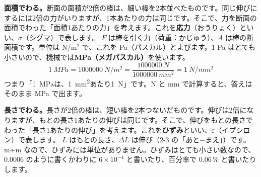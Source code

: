 \noindent\textbf{面積でわる。}\quad 断面の面積が2倍の棒は、細い棒を2本並べたものです。同じ伸びにするには2倍の力がいりますが、1本あたりの力は同じです。そこで、力を断面の面積でわった「面積1あたりの力」を考えます。これを\textbf{応力}（おうりょく）といい、$\sigma$（シグマ）で表します。
\label{ph:力-8:sigmaE}$F$ は棒を引く力（荷重：かじゅう）、$A$ は棒の断面積です。単位は N/m$^2$ で、これを Pa（パスカル）とよびます。1 Pa はとても小さいので、機械では\textbf{MPa（メガパスカル）}を使います。
\[\qty{1}{MPa}=\qty{1000000}{N/m^2}=\frac{\qty{1000000}{N}}{\qty{1000000}{mm^2}}=\qty{1}{N/mm^2}\]
つまり「\qty{1}{MPa}は、\qty{1}{mm^2}あたり\qty{1}{N}」です。N と mm で計算すると、答えはそのまま MPa で出ます。

\noindent\textbf{長さでわる。}\quad 長さが2倍の棒は、短い棒を2本つないだものです。伸びは2倍になりますが、もとの長さ1あたりの伸びは同じです。そこで、伸びをもとの長さでわった「長さ1あたりの伸び」を考えます。これを\textbf{ひずみ}といい、$\varepsilon$（イプシロン）で表します。
$L$ はもとの長さ、$\Delta L$ は伸び（2-3 の「あと$-$まえ」）です。m÷m なので、ひずみには単位がありません。ひずみはとても小さい数なので、0.0006 のように書くかわりに $6\times10^{-4}$ と書いたり、百分率で 0.06\,\% と書いたりします。

